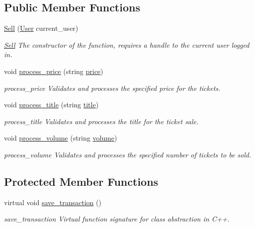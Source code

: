 \subsection*{Public Member Functions}
\begin{DoxyCompactItemize}
\item 
\hyperlink{class_sell_a63670944952b9ec10fa8aa8917f5f765}{Sell} (\hyperlink{class_user}{User} current\-\_\-user)
\begin{DoxyCompactList}\small\item\em \hyperlink{class_sell}{Sell} The constructor of the function, requires a handle to the current user logged in. \end{DoxyCompactList}\item 
void \hyperlink{class_sell_abd5f98879d9baddc5cbb17ae470f745a}{process\-\_\-price} (string \hyperlink{class_sell_a80d1e9b73edf0b6c8aa055cb5cdaa2f2}{price})
\begin{DoxyCompactList}\small\item\em process\-\_\-price Validates and processes the specified price for the tickets. \end{DoxyCompactList}\item 
void \hyperlink{class_sell_a5ba0aa4ff9dfbbb099b444497e4fbb54}{process\-\_\-title} (string \hyperlink{class_sell_a43a5eafe64b96968035e5a4013e47c75}{title})
\begin{DoxyCompactList}\small\item\em process\-\_\-title Validates and processes the title for the ticket sale. \end{DoxyCompactList}\item 
void \hyperlink{class_sell_a2ebcdb886e993032835b7c621588ac76}{process\-\_\-volume} (string \hyperlink{class_sell_aed48ca0bcd2162fd4fd495873e2631f5}{volume})
\begin{DoxyCompactList}\small\item\em process\-\_\-volume Validates and processes the specified number of tickets to be sold. \end{DoxyCompactList}\end{DoxyCompactItemize}
\subsection*{Protected Member Functions}
\begin{DoxyCompactItemize}
\item 
virtual void \hyperlink{class_sell_a8e5996ad33eb07eef44f55deba6c298e}{save\-\_\-transaction} ()
\begin{DoxyCompactList}\small\item\em save\-\_\-transaction Virtual function signature for class abstraction in C++. \end{DoxyCompactList}\end{DoxyCompactItemize}
